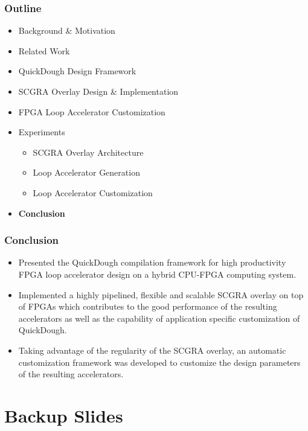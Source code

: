 \documentclass[accentcolor=tud1a,colorbacktitle,inverttitle,landscape,german,presentation,t]{tudbeamer}
\begin{document}
  \begin{frame}
  \frametitle{Outline}
  \begin{itemize}
  \setlength{\itemsep}{6pt}
  \item Background \& Motivation
  \item Related Work
  \item QuickDough Design Framework
  \item SCGRA Overlay Design \& Implementation
  \item FPGA Loop Accelerator Customization
  \item Experiments
  \begin{itemize}
    \setlength{\itemsep}{6pt}
    \item SCGRA Overlay Architecture
    \item Loop Accelerator Generation
    \item Loop Accelerator Customization
  \end{itemize}
  \item \textbf{Conclusion}
  \end{itemize}
  \end{frame}
  
  \begin{frame}
  \frametitle{Conclusion}
  \setlength{\itemsep}{6pt}
  \begin{itemize}
  \item Presented the QuickDough compilation framework for high productivity FPGA loop accelerator design on a hybrid CPU-FPGA computing system.
  \item Implemented a highly pipelined, flexible and scalable SCGRA overlay on top of FPGAs which contributes to the good performance of the resulting accelerators as well as the capability of application specific customization of QuickDough.  
  \item Taking advantage of the regularity of the SCGRA overlay, an automatic customization framework was developed to customize the design parameters of the resulting accelerators.
  \end{itemize}
  \end{frame}

\section{Backup Slides}
\end{document}
